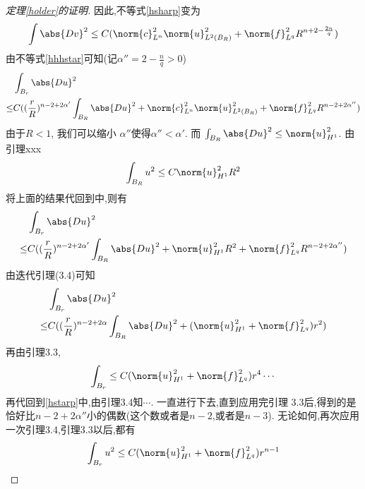 \begin{proof}[定理\eqref{holder}的证明]
    因此,不等式\eqref{hsharp}变为
    \begin{equation}
        \int\abs{Dv}^2 \le C(\norm{c}_{L^n}^2\norm{u}_{L^2(B_R)}^2+\norm{f}^2_{L^q}R^{n+2-\frac{2n}{q}})
    \end{equation}
    由不等式\eqref{hhhstar}可知(记$\alpha''=2-\frac{n}{q}>0$)
    \begin{equation} \label{hstarp}
        \begin{split}
            &\int_{B_r}\abs{Du}^2  \\
            \le & C((\frac{r}{R})^{n-2+2\alpha'}\int_{B_R}\abs{Du}^2 +\norm{c}^2_{L^n}\norm{u}^2_{L^2(B_R)}+\norm{f}^2_{L^q}R^{n-2+2\alpha''})
        \end{split}
    \end{equation}
    由于$R <1$, 我们可以缩小 $\alpha''$使得$\alpha'' < \alpha'$. 而 $\int_{B_R}\abs{Du}^2 \le \norm{u}^2_{H^1}$. 由引理xxx
    \begin{equation}
        \int_{B_R}u^2 \le C\norm{u}^2_{H^1}R^2
    \end{equation}
    将上面的结果代回到\label{hstarp}中,则有 
    \begin{equation} 
        \begin{split}
            &\int_{B_r}\abs{Du}^2  \\
            \le & C((\frac{r}{R})^{n-2+2\alpha'}\int_{B_R}\abs{Du}^2 +\norm{u}^2_{H^1}R^2+\norm{f}^2_{L^q}R^{n-2+2\alpha''})
        \end{split}
    \end{equation}
    由迭代引理(3.4)可知
    \begin{equation} 
        \begin{split}
            &\int_{B_r}\abs{Du}^2  \\
            \le & C((\frac{r}{R})^{n-2+2\alpha}\int_{B_R}\abs{Du}^2 +(\norm{u}^2_{H^1}+\norm{f}^2_{L^q})r^2)
        \end{split}
    \end{equation}
    再由引理3.3,
    \begin{equation}
        \int_{B_r} \le C(\norm{u}^2_{H^1}+\norm{f}^2_{L^q})r^4\cdots
    \end{equation}
    再代回到\eqref{hstarp}中,由引理3.4知$\cdots$. 一直进行下去,直到应用完引理 3.3后,得到的是恰好比$n-2+2\alpha''$小的偶数(这个数或者是$n-2$,或者是$n-3$). 无论如何,再次应用一次引理3.4,引理3.3以后,都有
    \begin{equation}
        \int_{B_r}u^2 \le C(\norm{u}^2_{H^1}+\norm{f}^2_{L^q})r^{n-1}
    \end{equation}

\end{proof}
